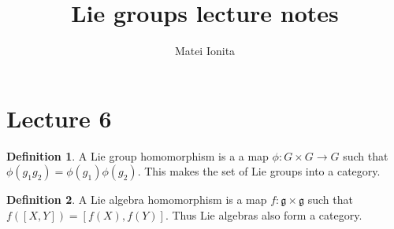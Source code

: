 \documentclass[12 pt]{article}
\title{Lie groups lecture notes}
\author{Matei Ionita}
\theoremstyle{plain}
\theoremstyle{definition}
\newtheorem{defn}{Definition}
\theoremstyle{remark}
\begin{document}
  \maketitle

\section*{Lecture 6}

\begin{defn}
A Lie group homomorphism is a a map $\phi:G\times G \to G$ such that $\phi(g_1g_2) = \phi(g_1) \phi(g_2)$. This makes the set of Lie groups into a category.
\end{defn}

\begin{defn}
A Lie algebra homomorphism is a map $f: \mathfrak{g} \times \mathfrak{g}$ such that $f([X,Y]) = [f(X), f(Y)]$. Thus Lie algebras also form a category.
\end{defn}
\end{document}
